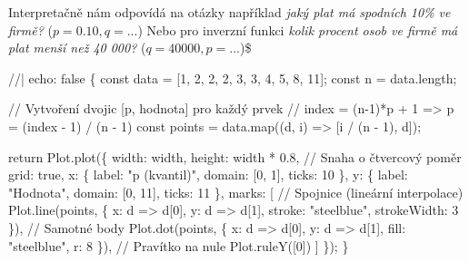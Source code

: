 \documentclass[
  czech,
  11pt,
  letterpaper,
  DIV=11,
  numbers=noendperiod]{scrreprt}
\newenvironment{Shaded}{\begin{snugshade}}{\end{snugshade}}
\newcommand{\NormalTok}[1]{\textcolor[rgb]{0.00,0.23,0.31}{#1}}
\begin{document}
\begin{tcolorbox}[enhanced jigsaw, arc=.35mm, bottomrule=.15mm, bottomtitle=1mm, breakable, colback=white, colbacktitle=quarto-callout-note-color!10!white, colframe=quarto-callout-note-color-frame, coltitle=black, left=2mm, leftrule=.75mm, opacityback=0, opacitybacktitle=0.6, rightrule=.15mm, title=\textcolor{quarto-callout-note-color}{\faInfo}\hspace{0.5em}{Poznámka}, titlerule=0mm, toprule=.15mm, toptitle=1mm]

Interpretačně nám odpovídá na otázky například \emph{jaký plat má
spodních 10\% ve firmě?} (\(p=0.10, q=...\)) Nebo pro inverzní funkci
\emph{kolik procent osob ve firmě má plat menší než 40 000?}
(\(q=40000, p=...\))\$

\end{tcolorbox}

\begin{Shaded}
\begin{Highlighting}[]
\NormalTok{//| echo: false}
\NormalTok{\{}
\NormalTok{  const data = [1, 2, 2, 2, 3, 3, 4, 5, 8, 11];}
\NormalTok{  const n = data.length;}

\NormalTok{  // Vytvoření dvojic [p, hodnota] pro každý prvek}
\NormalTok{  // index = (n{-}1)*p + 1  =\textgreater{}  p = (index {-} 1) / (n {-} 1)}
\NormalTok{  const points = data.map((d, i) =\textgreater{} [i / (n {-} 1), d]);}

\NormalTok{  return Plot.plot(\{}
\NormalTok{    width: width,}
\NormalTok{    height: width * 0.8, // Snaha o čtvercový poměr}
\NormalTok{    grid: true,}
\NormalTok{    x: \{}
\NormalTok{      label: "p (kvantil)",}
\NormalTok{      domain: [0, 1],}
\NormalTok{      ticks: 10}
\NormalTok{    \},}
\NormalTok{    y: \{}
\NormalTok{      label: "Hodnota",}
\NormalTok{      domain: [0, 11],}
\NormalTok{      ticks: 11}
\NormalTok{    \},}
\NormalTok{    marks: [}
\NormalTok{      // Spojnice (lineární interpolace)}
\NormalTok{      Plot.line(points, \{}
\NormalTok{        x: d =\textgreater{} d[0], }
\NormalTok{        y: d =\textgreater{} d[1], }
\NormalTok{        stroke: "steelblue", }
\NormalTok{        strokeWidth: 3}
\NormalTok{      \}),}
\NormalTok{      // Samotné body}
\NormalTok{      Plot.dot(points, \{}
\NormalTok{        x: d =\textgreater{} d[0], }
\NormalTok{        y: d =\textgreater{} d[1], }
\NormalTok{        fill: "steelblue", }
\NormalTok{        r: 8}
\NormalTok{      \}),}
\NormalTok{      // Pravítko na nule}
\NormalTok{      Plot.ruleY([0])}
\NormalTok{    ]}
\NormalTok{  \});}
\NormalTok{\}  }
\end{Highlighting}
\end{Shaded}
\end{document}
